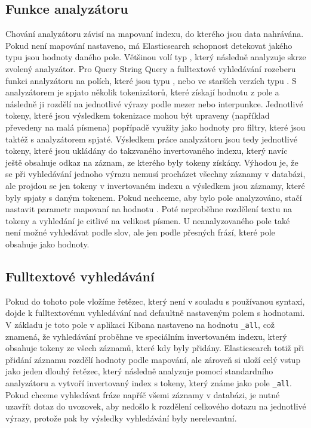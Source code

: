 \documentclass[czech,BP]{thesiskiv}
\begin{document}
\subsection{Funkce analyzátoru}
Chování analyzátoru závisí na mapovaní indexu, do kterého jsou data nahrávána. Pokud není mapování nastaveno, má Elasticsearch schopnost detekovat jakého typu jsou hodnoty daného pole. Většinou volí typ , který následně analyzuje skrze zvolený analyzátor. Pro Query String Query a fulltextové vyhledávání rozeberu funkci analyzátoru na polích, které jsou typu , nebo ve starších verzích typu . S analyzátorem je spjato několik tokenizátorů, které získají hodnotu z pole a následně ji rozdělí na jednotlivé výrazy podle mezer nebo interpunkce. Jednotlivé tokeny, které jsou výsledkem tokenizace mohou být upraveny (například převedeny na malá písmena) popřípadě využity jako hodnoty pro filtry, které jsou taktéž s analyzátorem spjaté. Výsledkem práce analyzátoru jsou tedy jednotlivé tokeny, které jsou ukládány do takzvaného invertovaného indexu, který navíc ještě obsahuje odkaz na záznam, ze kterého byly tokeny získány. Výhodou je, že se při vyhledávání jednoho výrazu nemusí procházet všechny záznamy v databázi, ale projdou se jen tokeny v invertovaném indexu a výsledkem jsou záznamy, které byly spjaty s daným tokenem. Pokud nechceme, aby bylo pole analyzováno, stačí nastavit parametr mapovaní  na hodnotu . Poté neproběhne rozdělení textu na tokeny a vyhledání je citlivé na velikost písmen. U neanalyzovaného pole také není možné vyhledávat podle slov, ale jen podle přesných frází, které pole obsahuje jako hodnoty.

\subsection{Fulltextové vyhledávání}
Pokud do tohoto pole vložíme řetězec, který není v souladu s používanou syntaxí, dojde k fulltextovému vyhledávání nad defaultně nastaveným polem s hodnotami. V základu je toto pole v aplikaci Kibana nastaveno na hodnotu \texttt{\_all}, což znamená, že vyhledávání proběhne ve speciálním invertovaném indexu, který obsahuje tokeny ze všech záznamů, které kdy byly přidány. Elasticsearch totiž při přidání záznamu rozdělí hodnoty podle mapování, ale zároveň si uloží celý vstup jako jeden dlouhý řetězec, který následně analyzuje pomocí standardního analyzátoru a vytvoří invertovaný index s tokeny, který známe jako pole \texttt{\_all}. Pokud chceme vyhledávat fráze napříč všemi záznamy v databázi, je nutné uzavřít dotaz do uvozovek, aby nedošlo k rozdělení celkového dotazu na jednotlivé výrazy, protože pak by výsledky vyhledávání byly nerelevantní.
\end{document}
